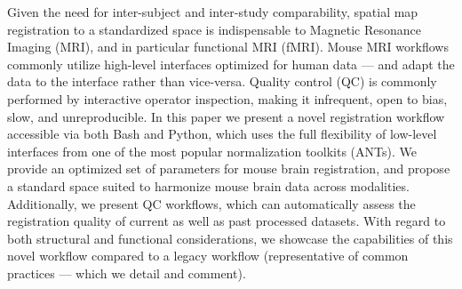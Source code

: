 Given the need for inter-subject and inter-study comparability, spatial map registration to a standardized space is indispensable to Magnetic Resonance Imaging (MRI), and in particular functional MRI (fMRI).
Mouse MRI workflows commonly utilize high-level interfaces optimized for human data --- and adapt the data to the interface rather than vice-versa.
Quality control (QC) is commonly performed by interactive operator inspection, making it infrequent, open to bias, slow, and unreproducible.
In this paper we present a novel registration workflow accessible via both Bash and Python, which uses the full flexibility of low-level interfaces from one of the most popular normalization toolkits (ANTs).
We provide an optimized set of parameters for mouse brain registration, and propose a standard space suited to harmonize mouse brain data across modalities.
Additionally, we present QC workflows, which can automatically assess the registration quality of current as well as past processed datasets.
With regard to both structural and functional considerations, we showcase the capabilities of this novel workflow compared to a legacy workflow (representative of common practices --- which we detail and comment).
